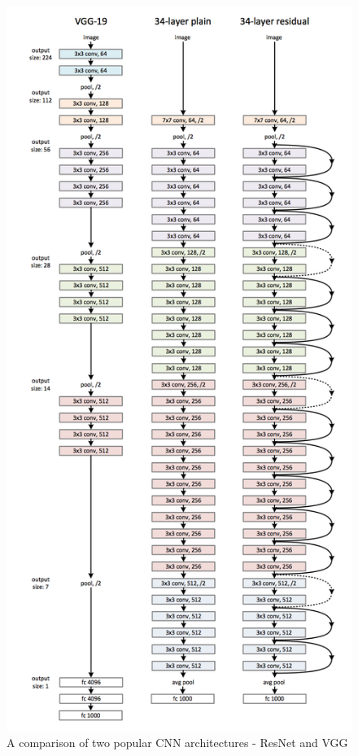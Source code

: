\documentclass[times, utf8, diplomski]{fer}
\begin{document}
\begin{figure}
  \includegraphics[scale=0.7]{figures/resnet_vgg_comparison.png}
  \centering
  \caption{A comparison of two popular CNN architectures - ResNet and VGG }
  \label{fig:vgg_resnet_comparison}
\end{figure}
\end{document}
